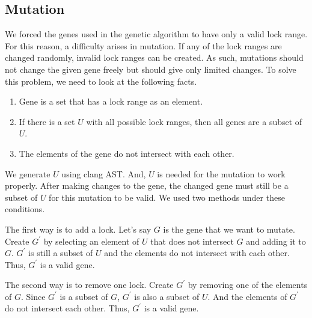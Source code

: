 \subsection{Mutation}
We forced the genes used in the genetic algorithm to have only a valid lock range. For this reason, a difficulty arises in mutation. If any of the lock ranges are changed randomly,  invalid lock ranges can be created. As such, mutations should not change the given gene freely but should give only limited changes. To solve this problem, we need to look at the following facts.

\begin{enumerate}
    \item Gene is a set that has a lock range as an element.
    \item If there is a set $U$ with all possible lock ranges, then all genes are a subset of $U$.
    \item The elements of the gene do not intersect with each other.
\end{enumerate}

We generate $U$ using clang AST. And, $U$ is needed for the mutation to work properly. After making changes to the gene, the changed gene must still be a subset of $U$ for this mutation to be valid. We used two methods under these conditions.

The first way is to add a lock. Let's say $G$ is the gene that we want to mutate. Create $G^{'}$ by selecting an element of $U$ that does not intersect $G$ and adding it to $G$. $G^{'}$ is still a subset of $U$ and the elements do not intersect with each other. Thus, $G^{'}$ is a valid gene.

The second way is to remove one lock. Create $G^{'}$ by removing one of the elements of $G$. Since $G^{'}$ is a subset of $G$, $G^{'}$ is also a subset of $U$. And the elements of $G^{'}$ do not intersect each other. Thus, $G^{'}$ is a valid gene.
